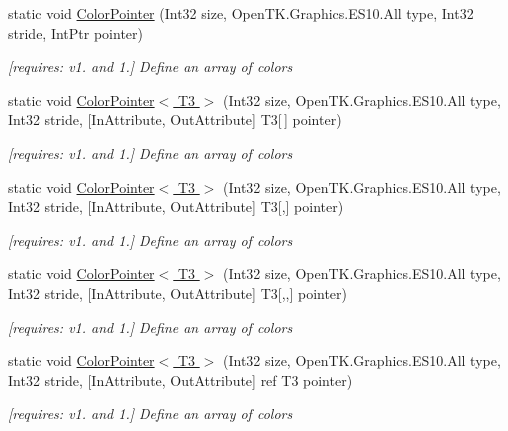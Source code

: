 \begin{DoxyCompactItemize}
static void \hyperlink{class_open_t_k_1_1_graphics_1_1_e_s10_1_1_g_l_abac3c20f0648c3d39c9cbba75d6026bd}{Color\-Pointer} (Int32 size, Open\-T\-K.\-Graphics.\-E\-S10.\-All type, Int32 stride, Int\-Ptr pointer)
\begin{DoxyCompactList}\small\item\em \mbox{[}requires\-: v1. and 1.\mbox{]} Define an array of colors \end{DoxyCompactList}\item 
static void \hyperlink{class_open_t_k_1_1_graphics_1_1_e_s10_1_1_g_l_aad342f266faf0b780c480c42ed542d4b}{Color\-Pointer$<$ T3 $>$} (Int32 size, Open\-T\-K.\-Graphics.\-E\-S10.\-All type, Int32 stride, \mbox{[}In\-Attribute, Out\-Attribute\mbox{]} T3\mbox{[}$\,$\mbox{]} pointer)
\begin{DoxyCompactList}\small\item\em \mbox{[}requires\-: v1. and 1.\mbox{]} Define an array of colors \end{DoxyCompactList}\item 
static void \hyperlink{class_open_t_k_1_1_graphics_1_1_e_s10_1_1_g_l_a59263c332720b6f06bc747a409b9b29e}{Color\-Pointer$<$ T3 $>$} (Int32 size, Open\-T\-K.\-Graphics.\-E\-S10.\-All type, Int32 stride, \mbox{[}In\-Attribute, Out\-Attribute\mbox{]} T3\mbox{[},\mbox{]} pointer)
\begin{DoxyCompactList}\small\item\em \mbox{[}requires\-: v1. and 1.\mbox{]} Define an array of colors \end{DoxyCompactList}\item 
static void \hyperlink{class_open_t_k_1_1_graphics_1_1_e_s10_1_1_g_l_a46a37435ca6ef049d44de3ad162cf76a}{Color\-Pointer$<$ T3 $>$} (Int32 size, Open\-T\-K.\-Graphics.\-E\-S10.\-All type, Int32 stride, \mbox{[}In\-Attribute, Out\-Attribute\mbox{]} T3\mbox{[},,\mbox{]} pointer)
\begin{DoxyCompactList}\small\item\em \mbox{[}requires\-: v1. and 1.\mbox{]} Define an array of colors \end{DoxyCompactList}\item 
static void \hyperlink{class_open_t_k_1_1_graphics_1_1_e_s10_1_1_g_l_a42a2b0a2ac86cab444eaa8cb04e92316}{Color\-Pointer$<$ T3 $>$} (Int32 size, Open\-T\-K.\-Graphics.\-E\-S10.\-All type, Int32 stride, \mbox{[}In\-Attribute, Out\-Attribute\mbox{]} ref T3 pointer)
\begin{DoxyCompactList}\small\item\em \mbox{[}requires\-: v1. and 1.\mbox{]} Define an array of colors \end{DoxyCompactList}\item 

\end{DoxyCompactItemize}
